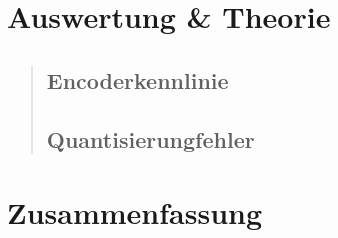 \section{Auswertung \& Theorie}
\begin{quote}
    
    \subsection{Encoderkennlinie}
    
    \begin{quote}
        
    
    
    \end{quote}
    
    
    \subsection{Quantisierungfehler}
    
    \begin{quote}
        
    \end{quote}    
    
\end{quote}

\section{Zusammenfassung}
\begin{quote}
	
 
    
\end{quote} %



